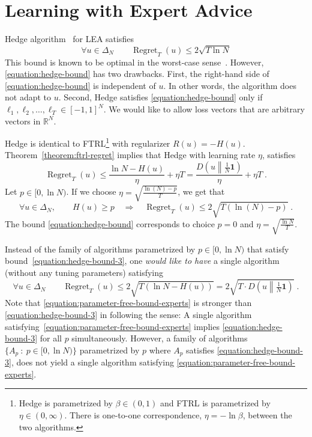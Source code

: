 \documentclass{colt2016} %
\DeclareMathOperator{\Regret}{Regret}
\newcommand{\R}{\mathbb{R}}     %
\newcommand{\KL}[2]{D\left({#1}\middle\|{#2}\right)}  %
\newcommand{\indicator}{\mathbf{1}}
\begin{document}
\section{Learning with Expert Advice}

Hedge algorithm~\citep{Freund-Schapire-1997} for LEA satisfies
\begin{equation}
\label{equation:hedge-bound}
\forall u \in \Delta_N \qquad \Regret_T(u) \le 2\sqrt{T \ln N}
\end{equation}
This bound is known to be optimal in the worst-case sense~\cite[Section
3.7]{Cesa-Bianchi-Lugosi-2006}. However, \eqref{equation:hedge-bound} has two
drawbacks.  First, the right-hand side of \eqref{equation:hedge-bound} is
independent of $u$.  In other words, the algorithm does not adapt to $u$.
Second, Hedge satisfies \eqref{equation:hedge-bound} only if $\ell_1, \ell_2,
\dots, \ell_T \in [-1,1]^N$. We would like to allow loss vectors that are
arbitrary vectors in $\R^N$.

Hedge is identical to FTRL\footnote{Hedge is
parametrized by $\beta \in (0,1)$ and FTRL is parametrized by $\eta \in (0,
\infty)$.  There is one-to-one correspondence, $\eta = - \ln \beta$, between
the two algorithms.} with regularizer $R(u) = -H(u)$.
Theorem~\ref{theorem:ftrl-regret} implies that Hedge with learning rate $\eta$, satisfies
\begin{equation}
\label{equation:hedge-bound-2}
\Regret_T(u) \le \frac{\ln N - H(u)}{\eta} + \eta T = \frac{\KL{u}{\frac{1}{N}\indicator}}{\eta} + \eta T \; .
\end{equation}
Let $p \in [0, \ln N)$. If we choose $\eta = \sqrt{\frac{\ln(N) - p}{T}}$, we get that
\begin{equation}
\label{equation:hedge-bound-3}
\forall u \in \Delta_N, \qquad H(u) \ge p \quad \Longrightarrow \quad \Regret_T(u) \le 2\sqrt{T (\ln(N) - p)} \; .
\end{equation}
The bound \eqref{equation:hedge-bound} corresponds to choice $p=0$ and
$\eta=\sqrt{\frac{\ln N}{T}}$.

Instead of the family of algorithms parametrized by $p \in [0,\ln N)$ that
satisfy bound~\eqref{equation:hedge-bound-3}, one \emph{would like to have} a single
algorithm (without any tuning parameters) satisfying
\begin{equation}
\label{equation:parameter-free-bound-experts}
\forall u \in \Delta_N \qquad \Regret_T(u) \le 2\sqrt{T (\ln N - H(u))} = 2\sqrt{T \cdot \KL{u}{\tfrac{1}{N} \indicator}} \; .
\end{equation}
Note that \eqref{equation:parameter-free-bound-experts} is stronger than
\eqref{equation:hedge-bound-3} in following the sense: A single algorithm
satisfying~\eqref{equation:parameter-free-bound-experts} implies
\eqref{equation:hedge-bound-3} for all $p$ simultaneously. However, a family
of algorithms $\{A_p ~:~ p \in [0,\ln N)\}$ parametrized by $p$ where $A_p$
satisfies \eqref{equation:hedge-bound-3}, does not yield a single
algorithm satisfying \eqref{equation:parameter-free-bound-experts}.
\end{document}
